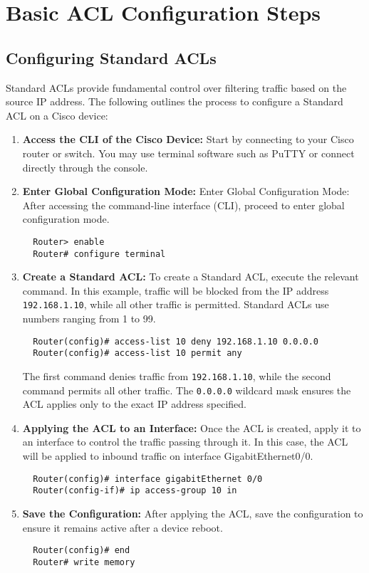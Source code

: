 \documentclass[11pt,a4paper]{article}
\begin{document}
\section*{Basic ACL Configuration Steps}
    \subsection*{Configuring Standard ACLs}
    Standard ACLs provide fundamental control over filtering traffic based on the source IP address. The following outlines the process to configure a Standard ACL on a Cisco device:
  
        \begin{enumerate}
            \item \textbf{Access the CLI of the Cisco Device:} Start by connecting to your Cisco router or switch. You may use terminal software such as PuTTY or connect directly through the console.

            \item \textbf{Enter Global Configuration Mode:} Enter Global Configuration Mode: After accessing the command-line interface (CLI), proceed to enter global configuration mode.

\begin{lstlisting}
  Router> enable
  Router# configure terminal
\end{lstlisting}

            \item \textbf{Create a Standard ACL:} To create a Standard ACL, execute the relevant command. In this example, traffic will be blocked from the IP address \lstinline{192.168.1.10}, while all other traffic is permitted. Standard ACLs use numbers ranging from 1 to 99.
\begin{lstlisting}
  Router(config)# access-list 10 deny 192.168.1.10 0.0.0.0
  Router(config)# access-list 10 permit any
\end{lstlisting}
            The first command denies traffic from \lstinline{192.168.1.10}, while the second command permits all other traffic. The \lstinline{0.0.0.0} wildcard mask ensures the ACL applies only to the exact IP address specified.

            \item \textbf{Applying the ACL to an Interface:} Once the ACL is created, apply it to an interface to control the traffic passing through it. In this case, the ACL will be applied to inbound traffic on interface GigabitEthernet0/0.
\begin{lstlisting}
  Router(config)# interface gigabitEthernet 0/0
  Router(config-if)# ip access-group 10 in
\end{lstlisting}
            \item \textbf{Save the Configuration:} After applying the ACL, save the configuration to ensure it remains active after a device reboot.
\begin{lstlisting}
  Router(config)# end
  Router# write memory
\end{lstlisting}
        \end{enumerate}
    
\end{document}
